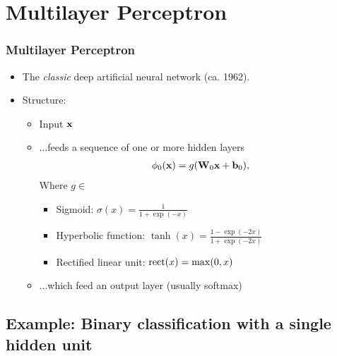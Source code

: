 \documentclass{beamer}
\begin{document}
\section{Multilayer Perceptron}

\begin{frame}
\frametitle{Multilayer Perceptron}

\begin{itemize}
\item The \textit{classic} deep artificial neural network (ca. 1962).
\item Structure:
\begin{itemize}
\item Input $\mathbf{x}$
\item ...feeds a sequence of one or more hidden layers
\begin{align*}
    \phi_0(\mathbf{x}) = g(\mathbf{W}_0 \mathbf{x} + \mathbf{b}_0),
\end{align*}
Where $g\in$
\begin{itemize}
        \item Sigmoid: $\sigma(x) = \frac{1}{1+\exp(-x)}$
        \item Hyperbolic function: $\tanh(x) = \frac{1-\exp(-2x)}{1+\exp(-2x)}$
        \item Rectified linear unit: $\text{rect}(x) = \max(0, x)$
    \end{itemize}
\item ...which feed an output layer (usually softmax)
\end{itemize}
\end{itemize}

\end{frame}

\subsection{Example: Binary classification with a single hidden unit}
\end{document}
